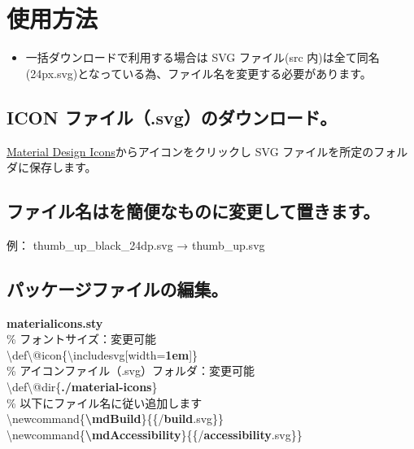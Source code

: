 \documentclass[10pt]{ltjarticle}
\def\fs#1{\fontsize{#1pt}{14pt}\selectfont}
\begin{document}
\newpage

\section{使用方法}

\begin{itemize}
  \item 一括ダウンロードで利用する場合は SVG ファイル(src 内)は全て同名(24px.svg)となっている為、ファイル名を変更する必要があります。
\end{itemize}

\subsection{ICON ファイル（.svg）のダウンロード。}
\href{https://fonts.google.com/icons}{Material Design Icons}からアイコンをクリックし SVG ファイルを所定のフォルダに保存します。

\subsection{ファイル名はを簡便なものに変更して置きます。}
\hspace{8mm}例： thumb\_up\_black\_24dp.svg → thumb\_up.svg　

\subsection{パッケージファイルの編集。}
\textbf{materialicons.sty}\\  
{\fs{8}
\hspace{4mm}\% フォントサイズ：変更可能\vspace{1mm}\\
\hspace{4mm}\textbackslash def\textbackslash @icon\{\textbackslash includesvg[width=\textbf{1em}]\}\vspace{2mm}\\
\hspace{4mm}\% アイコンファイル（.svg）フォルダ：変更可能\vspace{1mm}\\
\hspace{4mm}\textbackslash def\textbackslash @dir\{\textbf{./material-icons}\}\vspace{2mm}\\
\hspace{4mm}\% 以下にファイル名に従い追加します\vspace{1mm}\\
\hspace{4mm}\textbackslash newcommand\{\textcolor{code}{\textbf{\textbackslash mdBuild}}\}\{\textbackslash@icon\{\textbackslash@dir/\textcolor{code}{\textbf{build}}.svg\}\}\\
\hspace{4mm}\textbackslash newcommand\{\textcolor{code}{\textbf{\textbackslash mdAccessibility}}\}\{\textbackslash@icon\{\textbackslash@dir/\textcolor{code}{\textbf{accessibility}}.svg\}\}
}
\end{document}

